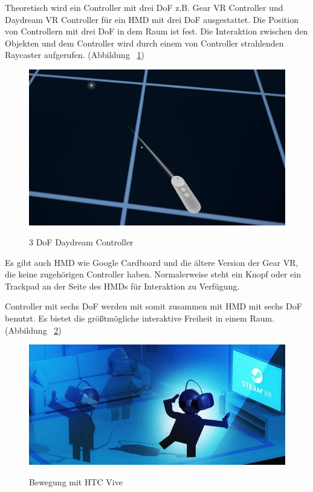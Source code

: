   Theoretisch wird ein Controller mit drei DoF z.B. Gear VR Controller und Daydream VR Controller für ein HMD mit drei DoF ausgestattet. Die Position von Controllern mit drei DoF in dem Raum ist fest. Die Interaktion zwischen den Objekten und dem Controller wird durch einem von Controller strahlenden Raycaster aufgerufen. (Abbildung ~\ref{fig:3dcontroller})

\begin{figure}[ht]
\vspace*{1em}
\centering
\caption{3 DoF Daydream Controller}
\includegraphics[width=\textwidth]{images/3dControllerDaydream.png}
\label{fig:3dcontroller} 
\end{figure}

  Es gibt auch HMD wie Google Cardboard und die ältere Version der Gear VR, die keine zugehörigen Controller haben. Normalerweise steht ein Knopf oder ein Trackpad an der Seite des HMDs für Interaktion zu Verfügung.
  
  Controller mit sechs DoF werden mit somit zusammen mit HMD mit sechs DoF benutzt. Es bietet die größtmögliche interaktive Freiheit in einem Raum. (Abbildung ~\ref{fig:6dcontroller})
  
\begin{figure}[ht]
\vspace*{1em}
\centering
\caption{Bewegung mit HTC Vive}
\includegraphics[width=\textwidth]{images/6dcontroller.jpg}
\label{fig:6dcontroller} 
\end{figure}

